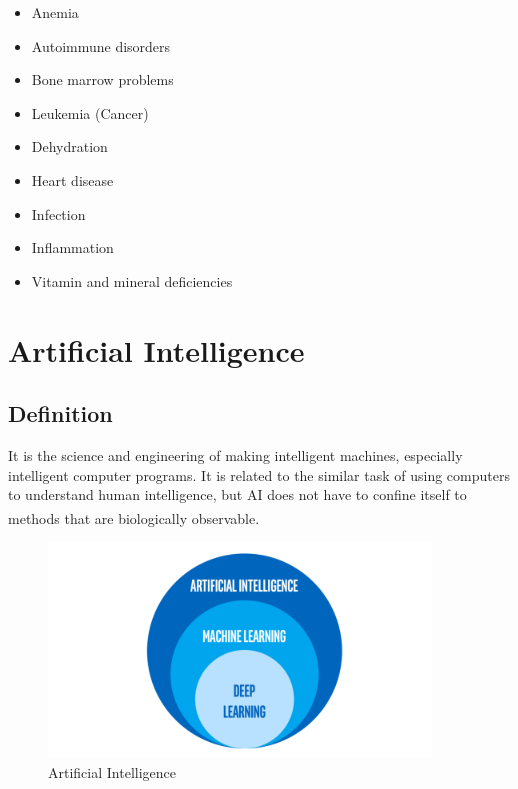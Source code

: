 \begin{itemize}
  \item Anemia
  \vspace{-0.05in}
  \item Autoimmune disorders
  \vspace{-0.05in}
  \item Bone marrow problems
  \vspace{-0.05in}
  \item Leukemia (Cancer)
  \vspace{-0.05in}
  \item Dehydration
  \vspace{-0.05in}
  \item Heart disease
  \vspace{-0.05in}
  \item Infection
  \vspace{-0.05in}
  \item Inflammation
  \vspace{-0.05in}
  \item Vitamin and mineral deficiencies
  \vspace{-0.05in}
\end{itemize}
\section{Artificial Intelligence}
\subsection{Definition}
\hspace{\parindent}
It is the science and engineering of making intelligent machines, especially intelligent computer programs. It is related to the similar task of using computers to understand human intelligence, but AI does not have to confine itself to methods that are biologically observable. \textsuperscript{\cite{mccarthy2004artificial}}

\vspace{0.2in}

\begin{figure}[h]
\centering
  \vspace{-0.1in}
    \centerline{\includegraphics[width = 4in]{../images/artificial-intelligence.png}}
    \caption{Artificial Intelligence}
\end{figure}

